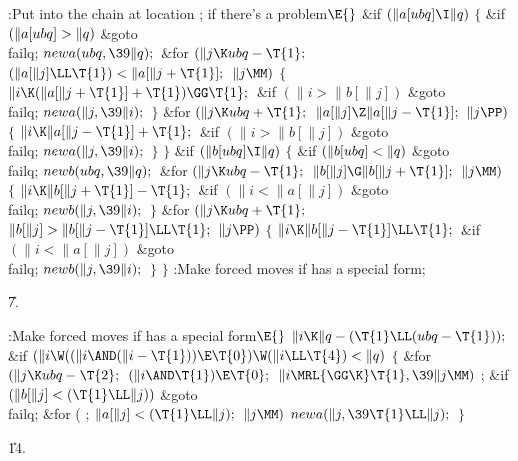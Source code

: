\Y\B\4:Put  into the chain at location ;  if there's a problem\X${}\E{}$\6
\&{if} ${}(\|a[\\{ubq}]\I\|q){}$\5
${}\{{}$\1\6
\&{if} ${}(\|a[\\{ubq}]>\|q){}$\1\5
\&{goto} \\{failq};\2\6
${}\\{newa}(\\{ubq},\39\|q);{}$\6
\&{for} ${}(\|j\K\\{ubq}-\T{1};{}$ ${}(\|a[\|j]\LL\T{1})<\|a[\|j+\T{1}];{}$ ${}%
\|j\MM){}$\5
${}\{{}$\1\6
${}\|i\K(\|a[\|j+\T{1}]+\T{1})\GG\T{1};{}$\6
\&{if} ${}(\|i>\|b[\|j]){}$\1\5
\&{goto} \\{failq};\2\6
${}\\{newa}(\|j,\39\|i);{}$\6
\4${}\}{}$\2\6
\&{for} ${}(\|j\K\\{ubq}+\T{1};{}$ ${}\|a[\|j]\Z\|a[\|j-\T{1}];{}$ ${}\|j%
\PP){}$\5
${}\{{}$\1\6
${}\|i\K\|a[\|j-\T{1}]+\T{1};{}$\6
\&{if} ${}(\|i>\|b[\|j]){}$\1\5
\&{goto} \\{failq};\2\6
${}\\{newa}(\|j,\39\|i);{}$\6
\4${}\}{}$\2\6
\4${}\}{}$\2\6
\&{if} ${}(\|b[\\{ubq}]\I\|q){}$\5
${}\{{}$\1\6
\&{if} ${}(\|b[\\{ubq}]<\|q){}$\1\5
\&{goto} \\{failq};\2\6
${}\\{newb}(\\{ubq},\39\|q);{}$\6
\&{for} ${}(\|j\K\\{ubq}-\T{1};{}$ ${}\|b[\|j]\G\|b[\|j+\T{1}];{}$ ${}\|j%
\MM){}$\5
${}\{{}$\1\6
${}\|i\K\|b[\|j+\T{1}]-\T{1};{}$\6
\&{if} ${}(\|i<\|a[\|j]){}$\1\5
\&{goto} \\{failq};\2\6
${}\\{newb}(\|j,\39\|i);{}$\6
\4${}\}{}$\2\6
\&{for} ${}(\|j\K\\{ubq}+\T{1};{}$ ${}\|b[\|j]>\|b[\|j-\T{1}]\LL\T{1};{}$ ${}%
\|j\PP){}$\5
${}\{{}$\1\6
${}\|i\K\|b[\|j-\T{1}]\LL\T{1};{}$\6
\&{if} ${}(\|i<\|a[\|j]){}$\1\5
\&{goto} \\{failq};\2\6
${}\\{newb}(\|j,\39\|i);{}$\6
\4${}\}{}$\2\6
\4${}\}{}$\2\6
:Make forced moves if  has a special form\X;\par
\U7.\fi

\B{}:Make forced moves if  has a special form\X${}\E{}$\6
$\|i\K\|q-(\T{1}\LL(\\{ubq}-\T{1}));{}$\6
\&{if} ${}(\|i\W((\|i\AND(\|i-\T{1}))\E\T{0})\W(\|i\LL\T{4})<\|q){}$\5
${}\{{}$\1\6
\&{for} ${}(\|j\K\\{ubq}-\T{2};{}$ ${}(\|i\AND\T{1})\E\T{0};{}$ ${}\|i\MRL{{%
\GG}{\K}}\T{1},\39\|j\MM){}$\1\5
;\2\6
\&{if} ${}(\|b[\|j]<(\T{1}\LL\|j)){}$\1\5
\&{goto} \\{failq};\2\6
\&{for} ( ; ${}\|a[\|j]<(\T{1}\LL\|j);{}$ ${}\|j\MM){}$\1\5
${}\\{newa}(\|j,\39\T{1}\LL\|j);{}$\2\6
\4${}\}{}$\2\par
\U14.\fi

